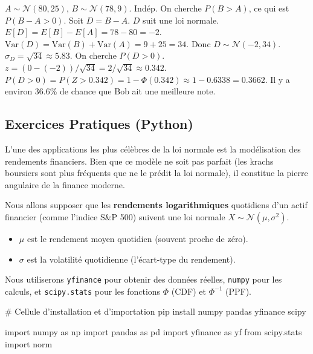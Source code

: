 \begin{correctionbox}
$A \sim \mathcal{N}(80, 25)$, $B \sim \mathcal{N}(78, 9)$. Indép.
On cherche $P(B > A)$, ce qui est $P(B - A > 0)$.
Soit $D = B - A$. $D$ suit une loi normale.
$E[D] = E[B] - E[A] = 78 - 80 = -2$.
$\text{Var}(D) = \text{Var}(B) + \text{Var}(A) = 9 + 25 = 34$.
Donc $D \sim \mathcal{N}(-2, 34)$. $\sigma_D = \sqrt{34} \approx 5.83$.
On cherche $P(D > 0)$.
$z = (0 - (-2)) / \sqrt{34} = 2 / \sqrt{34} \approx 0.342$.
$P(D > 0) = P(Z > 0.342) = 1 - \Phi(0.342) \approx 1 - 0.6338 = 0.3662$.
Il y a environ 36.6\% de chance que Bob ait une meilleure note.
\end{correctionbox}

\subsection{Exercices Pratiques (Python)}

L'une des applications les plus célèbres de la loi normale est la modélisation des rendements financiers. Bien que ce modèle ne soit pas parfait (les krachs boursiers sont plus fréquents que ne le prédit la loi normale), il constitue la pierre angulaire de la finance moderne.

Nous allons supposer que les \textbf{rendements logarithmiques} quotidiens d'un actif financier (comme l'indice S\&P 500) suivent une loi normale $X \sim \mathcal{N}(\mu, \sigma^2)$.

\begin{itemize}
    \item $\mu$ est le rendement moyen quotidien (souvent proche de zéro).
    \item $\sigma$ est la volatilité quotidienne (l'écart-type du rendement).
\end{itemize}

Nous utiliserons \texttt{yfinance} pour obtenir des données réelles, \texttt{numpy} pour les calculs, et \texttt{scipy.stats} pour les fonctions $\Phi$ (CDF) et $\Phi^{-1}$ (PPF).

\begin{codecell}
# Cellule d'installation et d'importation
pip install numpy pandas yfinance scipy
\end{codecell}

\begin{codecell}
import numpy as np
import pandas as pd
import yfinance as yf
from scipy.stats import norm
\end{codecell}

